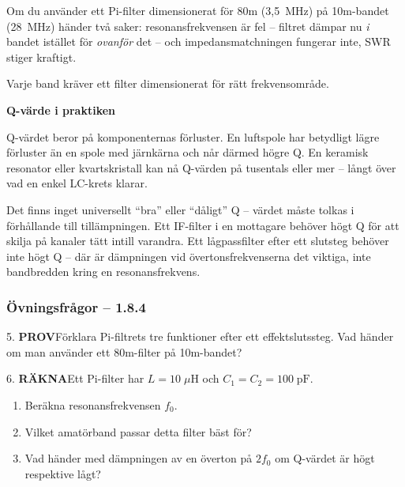 \documentclass[a4paper,11pt,twoside]{book}
\newcommand{\emoji}[1]{{\emojifont #1}}
\newcommand{\qrakna}{\colorbox{bluepale}{\textcolor{bluedark}{\headingfont\bfseries\tiny RÄKNA}}}
\newcommand{\qprov}{\colorbox{redpale}{\textcolor{reddark}{\headingfont\bfseries\tiny PROV}}}
\begin{document}
\begin{redbox}[title={\emoji{⚠️} Fallgrop -- fel filter på fel band}]
Om du använder ett Pi-filter dimensionerat för 80m (3,5~MHz)
på 10m-bandet (28~MHz) händer två saker:
resonansfrekvensen är fel -- filtret dämpar nu \emph{i} bandet
istället för \emph{ovanför} det -- och impedansmatchningen
fungerar inte, SWR stiger kraftigt.

Varje band kräver ett filter dimensionerat för rätt frekvensområde.
\end{redbox}

\noindent\textbf{Q-värde i praktiken}
\medskip

Q-värdet beror på komponenternas förluster. En luftspole har
betydligt lägre förluster än en spole med järnkärna och når
därmed högre Q. En keramisk resonator eller kvartskristall kan
nå Q-värden på tusentals eller mer -- långt över vad en enkel
LC-krets klarar.

Det finns inget universellt ``bra'' eller ``dåligt'' Q -- värdet
måste tolkas i förhållande till tillämpningen. Ett IF-filter i
en mottagare behöver högt Q för att skilja på kanaler tätt
intill varandra. Ett lågpassfilter efter ett slutsteg behöver
inte högt Q -- där är dämpningen vid övertonsfrekvenserna det
viktiga, inte bandbredden kring en resonansfrekvens.

\subsubsection*{Övningsfrågor -- 1.8.4}

\begin{qblock}{5.}
\qprov\quad Förklara Pi-filtrets tre funktioner efter ett
effektslutssteg. Vad händer om man använder ett 80m-filter
på 10m-bandet?
\end{qblock}

\begin{qblock}{6.}
\qrakna\quad Ett Pi-filter har $L = 10\;\mu\text{H}$ och
$C_1 = C_2 = 100\;\text{pF}$.
\begin{enumerate}[label=\alph*)]
  \item Beräkna resonansfrekvensen $f_0$.
  \item Vilket amatörband passar detta filter bäst för?
  \item Vad händer med dämpningen av en överton på $2f_0$
        om Q-värdet är högt respektive lågt?
\end{enumerate}
\end{qblock}
\end{document}
